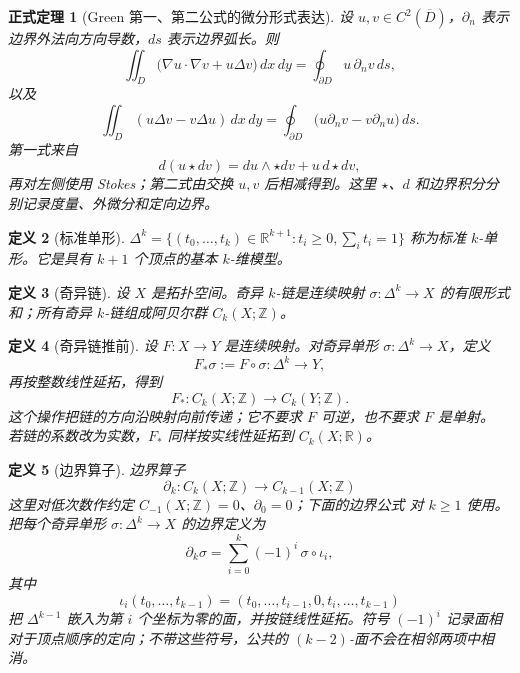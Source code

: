 \documentclass[UTF8,fontset=none,a4paper,11pt]{ctexart}
\theoremstyle{foundation-definition}
\newtheorem{definition}{定义}[section]
\theoremstyle{foundation-theorem}
\newtheorem{theorem}[definition]{正式定理}
\theoremstyle{foundation-proposition}
\theoremstyle{foundation-example}
\theoremstyle{foundation-remark}
\theoremstyle{foundation-theorem}
\begin{document}
\begin{theorem}[Green 第一、第二公式的微分形式表达]\label{thm:green-first-second}
设 \(u,v\in C^2(\overline D)\)，\(\partial_n\) 表示边界外法向方向导数，\(ds\) 表示边界弧长。则
\[
\iint_D\bigl(\nabla u\cdot\nabla v+u\Delta v\bigr)\,dx\,dy
=\oint_{\partial D}u\,\partial_nv\,ds,
\]
以及
\[
\iint_D(u\Delta v-v\Delta u)\,dx\,dy
=\oint_{\partial D}
\bigl(u\partial_nv-v\partial_nu\bigr)\,ds.
\]
第一式来自
\[
d(u\star dv)=du\wedge\star dv+u\,d\star dv,
\]
再对左侧使用 Stokes；第二式由交换 \(u,v\) 后相减得到。这里 \(\star\)、\(d\) 和边界积分分别记录度量、外微分和定向边界。
\end{theorem}

\begin{definition}[标准单形]\label{def:standard-simplex}
\(\Delta^k=\{(t_0,\dots,t_k)\in\mathbb R^{k+1}:t_i\geq0,\sum_i t_i=1\}\) 称为标准 \(k\)-单形。它是具有 \(k+1\) 个顶点的基本 \(k\)-维模型。
\end{definition}

\begin{definition}[奇异链]\label{def:singular-chain}
设 \(X\) 是拓扑空间。奇异 \(k\)-链是连续映射 \(\sigma:\Delta^k\to X\) 的有限形式和；所有奇异 \(k\)-链组成阿贝尔群 \(C_k(X;\mathbb Z)\)。
\end{definition}

\begin{definition}[奇异链推前]\label{def:chain-pushforward}
设 \(F:X\to Y\) 是连续映射。对奇异单形 \(\sigma:\Delta^k\to X\)，定义
\[
F_*\sigma:=F\circ\sigma:\Delta^k\to Y,
\]
再按整数线性延拓，得到
\[
F_*:C_k(X;\mathbb Z)\longrightarrow C_k(Y;\mathbb Z).
\]
这个操作把链的方向沿映射向前传递；它不要求 \(F\) 可逆，也不要求 \(F\) 是单射。
若链的系数改为实数，\(F_*\) 同样按实线性延拓到 \(C_k(X;\mathbb R)\)。
\end{definition}

\begin{definition}[边界算子]\label{def:boundary-operator}
边界算子
\[
\partial_k:C_k(X;\mathbb Z)\longrightarrow C_{k-1}(X;\mathbb Z)
\]
这里对低次数作约定 \(C_{-1}(X;\mathbb Z)=0\)、\(\partial_0=0\)；下面的边界公式
对 \(k\geq1\) 使用。
把每个奇异单形 \(\sigma:\Delta^k\to X\) 的边界定义为
\[
\partial_k\sigma=\sum_{i=0}^{k}(-1)^i\,\sigma\circ\iota_i,
\]
其中
\[
\iota_i(t_0,\ldots,t_{k-1})
=(t_0,\ldots,t_{i-1},0,t_i,\ldots,t_{k-1})
\]
把 \(\Delta^{k-1}\) 嵌入为第 \(i\) 个坐标为零的面，并按链线性延拓。符号 \((-1)^i\)
记录面相对于顶点顺序的定向；不带这些符号，公共的 \((k-2)\)-面不会在相邻两项中相消。
\end{definition}
\end{document}
